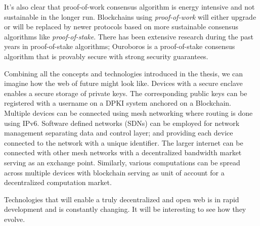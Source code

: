 	It's also clear that proof-of-work consensus algorithm is energy intensive and not sustainable in the longer run. Blockchains using \textit{proof-of-work} will either upgrade or will be replaced by newer protocols based on more sustainable consensus algorithms like \textit{proof-of-stake}. There has been extensive research during the past years in proof-of-stake algorithms; Ouroboros\cite{kiayias2017ouroboros} is a proof-of-stake consensus algorithm that is provably secure with strong security guarantees.
	
	Combining all the concepts and technologies introduced in the thesis, we can imagine how the web of future might look like. Devices with a secure enclave enables a secure storage of private keys. The corresponding public keys can be registered with a username on a DPKI system anchored on a Blockchain. Multiple devices can be connected using mesh networking where routing is done using IPv6. Software defined networks (SDNs) can be employed for network management separating data and control layer; and providing each device connected to the network with a unique identifier. The larger internet can be connected with other mesh networks with a decentralized bandwidth market serving as an exchange point. Similarly, various computations can be spread across multiple devices with blockchain serving as unit of account for a decentralized computation market.
	
	Technologies that will enable a truly decentralized and open web is in rapid development and is constantly changing. It will be interesting to see how they evolve.